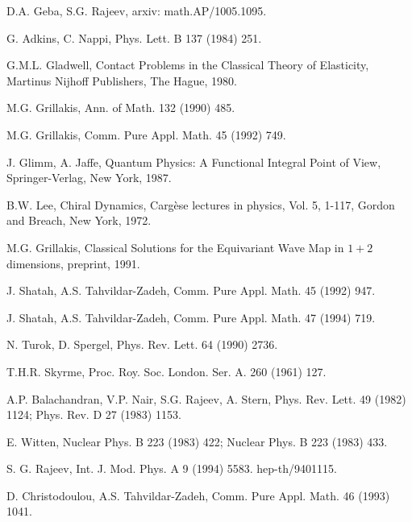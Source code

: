 \documentclass{amsart}
\begin{document}


\begin{thebibliography}{1}

 D.A. Geba, S.G. Rajeev, arxiv: math.AP/1005.1095.

G. Adkins, C. Nappi, Phys. Lett. B 137 (1984) 251.

 G.M.L. Gladwell, Contact Problems in the Classical Theory of Elasticity, Martinus Nijhoff Publishers, The Hague, 1980.

M.G. Grillakis, Ann. of Math. 132 (1990) 485.

M.G. Grillakis, Comm. Pure Appl. Math. 45 (1992) 749.

 J. Glimm, A. Jaffe, Quantum Physics: A Functional Integral Point of View, Springer-Verlag, New York, 1987.

 B.W. Lee,  Chiral Dynamics, Carg\`{e}se lectures in physics, Vol. 5, 1-117, Gordon and Breach, New York, 1972.

M.G. Grillakis, Classical Solutions for the Equivariant Wave Map in $1 + 2$ dimensions, preprint, 1991.

J. Shatah, A.S. Tahvildar-Zadeh, Comm. Pure Appl. Math. 45 (1992) 947.

J. Shatah, A.S. Tahvildar-Zadeh, Comm. Pure Appl. Math. 47 (1994) 719.

N. Turok, D. Spergel, Phys. Rev. Lett. 64 (1990) 2736.

T.H.R. Skyrme,  Proc. Roy. Soc. London. Ser. A. 260 (1961) 127.

A.P. Balachandran, V.P. Nair,  S.G. Rajeev, A. Stern, Phys. Rev. Lett. 49 (1982) 1124; Phys. Rev. D 27 (1983) 1153.

E. Witten, Nuclear Phys. B 223 (1983) 422; Nuclear Phys. B 223 (1983) 433. 

 S. G. Rajeev, Int. J. Mod. Phys. A 9 (1994) 5583. hep-th/9401115.

D. Christodoulou, A.S. Tahvildar-Zadeh, Comm. Pure Appl. Math. 46 (1993) 1041.

\end{thebibliography}
\end{document}
